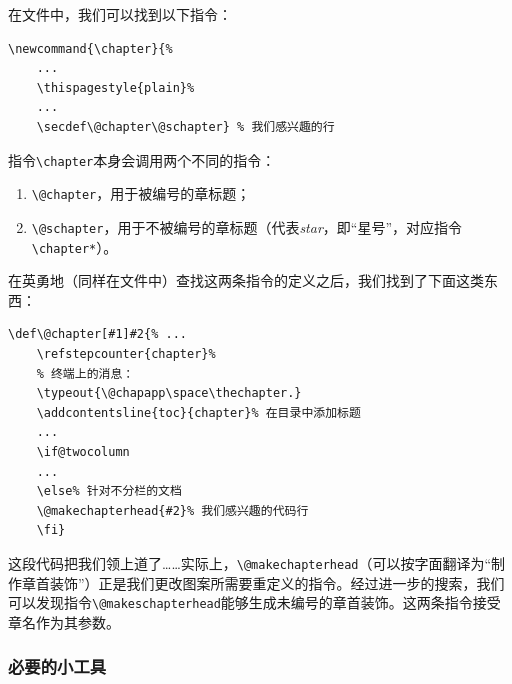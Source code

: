 在文件中，我们可以找到以下指令：

\begin{dmd}
\begin{verbatim}
\newcommand{\chapter}{% 
    ...
    \thispagestyle{plain}%
    ...
    \secdef\@chapter\@schapter} % 我们感兴趣的行
\end{verbatim}
\end{dmd}

指令\verb|\chapter|本身会调用两个不同的指令：

\begin{enumerate}
    \item \verb|\@chapter|，用于被编号的章标题；
    \item \verb|\@schapter|，用于不被编号的章标题（代表\emph{star}，即“星号”，对应指令\verb|\chapter*|）。
\end{enumerate}

在英勇地（同样在文件中）查找这两条指令的定义之后，我们找到了下面这类东西：

\begin{dmd}
\begin{verbatim}
\def\@chapter[#1]#2{% ...
    \refstepcounter{chapter}%
    % 终端上的消息：
    \typeout{\@chapapp\space\thechapter.} 
    \addcontentsline{toc}{chapter}% 在目录中添加标题
    ...
    \if@twocolumn
    ...
    \else% 针对不分栏的文档
    \@makechapterhead{#2}% 我们感兴趣的代码行
    \fi}
\end{verbatim}
\end{dmd}

这段代码把我们领上道了……实际上，\verb+\@makechapterhead+（可以按字面翻译为“制作章首装饰”）正是我们更改图案所需要重定义的指令。经过进一步的搜索，我们可以发现指令\verb|\@makeschapterhead|能够生成未编号的章首装饰。这两条指令接受章名作为其参数。

\subsubsection{必要的小工具}

